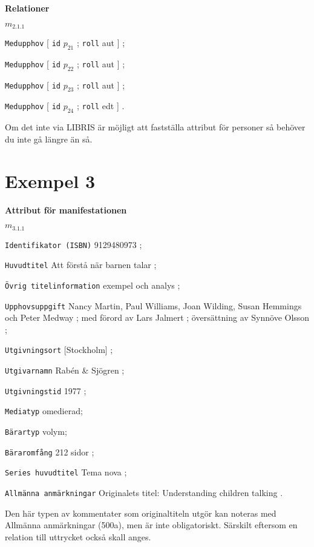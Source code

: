 \documentclass[a4,12pt]{article}
\begin{document}
\vspace{3mm}

\textbf{Relationer}

\noindent $m_{2.1.1}$

\texttt{Medupphov} [ \texttt{id} $p_21$ ; \texttt{roll} aut ] ;

\texttt{Medupphov} [ \texttt{id} $p_22$ ; \texttt{roll} aut ] ;

\texttt{Medupphov} [ \texttt{id} $p_23$ ; \texttt{roll} aut ] ;

\texttt{Medupphov} [ \texttt{id} $p_24$ ; \texttt{roll} edt ] .



\vspace{3mm}


\noindent Om det inte via LIBRIS är möjligt att fastställa attribut för personer
så behöver du inte gå längre än så.




\newpage


\section{Exempel 3}
\label{sec:ex3}



\textbf{Attribut för manifestationen}

\noindent $m_{3.1.1}$

 \texttt{Identifikator (ISBN)} 9129480973 ;

 \texttt{Huvudtitel} Att förstå när barnen talar ;
 
\texttt{Övrig titelinformation} exempel och analys ;

\texttt{Upphovsuppgift} Nancy Martin, Paul Williams, Joan Wilding, Susan Hemmings och Peter Medway ; med förord av Lars Jalmert ;
översättning av Synnöve Olsson ;

 \texttt{Utgivningsort} [Stockholm] ;

 \texttt{Utgivarnamn} Rabén \& Sjögren ;

 \texttt{Utgivningstid} 1977 ;
 
  \texttt{Mediatyp}  omedierad;
 
 \texttt{Bärartyp}  volym;

\texttt{Bäraromfång} 212 sidor ;

\texttt{Series huvudtitel} Tema nova ;

\texttt{Allmänna anmärkningar} Originalets titel: Understanding children talking .

\vspace{3mm}
Den här typen av kommentater som originaltiteln utgör kan noteras med
Allmänna anmärkningar (500a), men är inte obligatoriskt. Särskilt eftersom en relation till
uttrycket också skall anges. 
\vspace{3mm}
\end{document}

